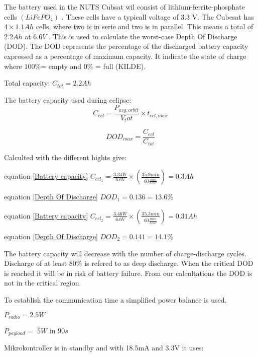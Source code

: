 The battery used in the NUTS Cubsat wil consist of lithium-ferrite-phosphate cells $(LiFePO_4)$ \cite{Overview of NUTS}. 
These cells have a typicall voltage of 3.3 V. The Cubesat has $4\times 1.1 Ah$ cells, where two is in serie and two is in parallel. This means a total of $2.2Ah$ at $6.6V$ \cite{Satellite Power Systems}. This is used to calculate the worst-case Depth Of Discharge (DOD). The DOD represents the percentage of the discharged battery capacity expressed as a percentage of maximum capacity. It indicate the state of charge where $100\% $= empty and  $0\%$ = full (KILDE).

\vspace{5 mm}Total capacity: $C_{tot} = 2.2 Ah$

The battery capacity used during eclipse: 
\begin{equation}
C_{ecl} = \frac{P_{avg,orbit}}{V_tot}\times t_{ecl,max}
\label{Battery capacity}
\end{equation}

 \begin{equation}
DOD_{max} = \frac{C_{ecl}}{C_{tot}}
\label{Depth Of Discharge}
\end{equation}

\vspace{5 mm}Calculted with the different hights give:

equation \ref{Battery capacity}
$C_{ecl_1} = \frac{3.34W}{6.6V}\times(\frac{35.9min}{60\frac{min}{hour}}) = 0.3Ah$

equation \ref{Depth Of Discharge}
$DOD_1 = 0.136 = 13.6 \%$

equation \ref{Battery capacity}
$C_{ecl_2} = \frac{3.46W}{6.6V}\times(\frac{35.3min}{60\frac{min}{hour}}) = 0.31 Ah$

equation \ref{Depth Of Discharge}
$DOD_2 = 0.141 = 14.1\%$

The battery capacity will decrease with the number of charge-discharge cycles. Discharge of at least 80\% is refered to as deep discharge. When the critical DOD is reached it will be in risk of battery failure. From our calcultations the DOD is not in the critical region. 

\vspace{5 mm}To establish the communication time a simplified power balance is used. 

\vspace{5 mm}$P_{radio} = 2.5 W$

$P_{payload} =$ $5 W$  in  $90s$

Mikrokontroller is in standby and with 18.5mA and 3.3V it uses:

